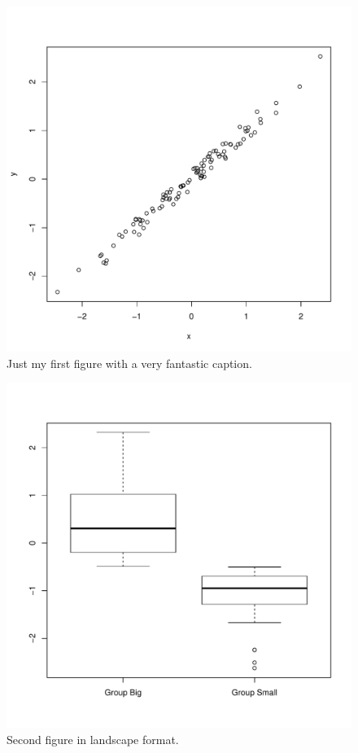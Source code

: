 \documentclass[11pt,a4paper]{article}
\newcommand{\blandscape}{\begin{landscape}}
\newcommand{\elandscape}{\end{landscape}}
\begin{document}
\clearpage

\listoffigures

\newpage

\begin{figure}[htbp]
\centering
\includegraphics{output/figures/Fig1-1.pdf}
\caption{Just my first figure with a very fantastic caption.}
\end{figure}

\newpage

\blandscape

\begin{figure}[htbp]
\centering
\includegraphics{output/figures/Fig2-1.pdf}
\caption{Second figure in landscape format.}
\end{figure}

\elandscape

\clearpage
\end{document}
